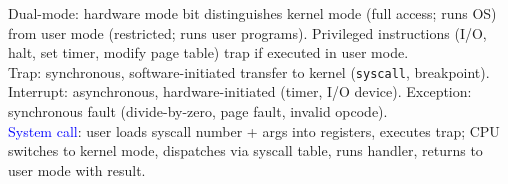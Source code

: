 \textcolor{Bittersweet}{Dual-mode}: hardware \textcolor{Bittersweet}{mode bit} distinguishes \textcolor{Bittersweet}{kernel mode} (full access; runs OS) from \textcolor{Bittersweet}{user mode} (restricted; runs user programs). \textcolor{Bittersweet}{Privileged instructions} (I/O, halt, set timer, modify page table) trap if executed in user mode.\\
\textcolor{Bittersweet}{Trap}: synchronous, software-initiated transfer to kernel (\texttt{syscall}, breakpoint).
\textcolor{Bittersweet}{Interrupt}: asynchronous, hardware-initiated (timer, I/O device).
\textcolor{Bittersweet}{Exception}: synchronous fault (divide-by-zero, page fault, invalid opcode).\\
\textcolor{Blue}{System call}: user loads syscall number + args into registers, executes trap; CPU switches to kernel mode, dispatches via syscall table, runs handler, returns to user mode with result.
